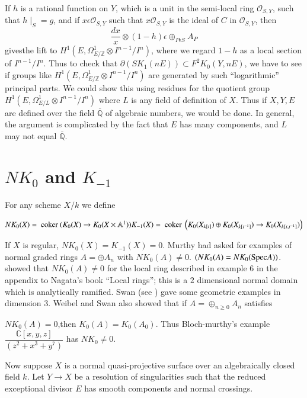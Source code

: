 If $h$ is a rational function on $Y$, which is a unit in the semi-local ring $\mathscr{O}_{S, Y}$, such that $h\mid_S=g$, and if $x\epsilon \mathscr{O}_{S, Y}$ such that $x\mathscr{O}_{S, Y}$ is the ideal of $C$ in $\mathscr{O}_{S, Y}$, then 
$$
\dfrac{dx}{x}\otimes (1-h)\epsilon \displaystyle\mathop{\oplus}_{P \epsilon S} A_P
$$
gives\pageoriginale the lift to $H^{1}\left(E, \Omega^{1}_{E/\mathbb{Z}} \otimes I^{n-1}/I^{n}\right)$, where we regard $1-h$ as a local section of $I^{n-1}/I^{n}$. Thus to check that $\partial(SK_1(nE))\subset F^{2}K_0(Y, nE)$, we have to see if groups like $H^{1}(E, \Omega^{1}_{E/ \mathbb{Z}}\otimes I^{n-1}/I^{n})$ are generated by such ``logarithmic'' principal parts. We could show this using residues for the quotient group $H^{1}(E, \Omega^{1}_{E/L}\otimes I^{n-1}/I^{n})$ where $L$ is any field of definition of $X$. Thus if $X, Y, E$ are defined over the field $\overline{\mathbb{Q}}$ of algebraic numbers, we would be done. In general, the argument is complicated by the fact that $E$ has many components, and $L$ may not equal $\overline{\mathbb{Q}}$. 

\section{\texorpdfstring{$NK_0$}{eq} and \texorpdfstring{$K_{-1}$}{eq}}

For any scheme $X/k$ we define 

$NK_0(X)=\text{ coker } (K_0(X)\to K_0(X\times \mathbb{A}^{1})) K_{-1}(X)=\text{ coker }\\ \left(K_0(X_{k[t]})\oplus K_0(X_{k[t^{-1}]})\to K_0(X_{k[t, t^{-1}]})\right)$

If $X$ is regular, $NK_0(X)=K_{-1}(X)=0$. Murthy had asked for examples of normal graded rings $A=\oplus A_n$ with $NK_0(A)\neq 0$. $(NK_0(A)=NK_0(\mathrm{Spec} A))$. \cite{Weibel} showed that $NK_0(A)\neq 0$ for the local ring described in example 6 in the appendix to Nagata's book ``Local rings''; this is a $2$ dimensional normal domain which is analytically ramified. Swan (see \cite{Weibel}) gave some geometric examples in dimension $3$. Weibel and Swan also showed that if $A=\displaystyle\mathop{\oplus}_{n \geq 0}A_n$ satisfies 

$NK_0(A)=0$,\pageoriginale then $K_0(A)=K_0(A_0)$. Thus Bloch-murthy's example $\dfrac{\mathbb{C}[x,y,z]}{\left(z^{2}+x^{3}+y^{7}\right)}$ has $NK_0\neq 0$. 

Now suppose $X$ is a normal quasi-projective surface over an algebraically closed field $k$. Let $Y\to X$ be a resolution of singularities such that the reduced exceptional divisor $E$ has smooth components and normal crossings. 

